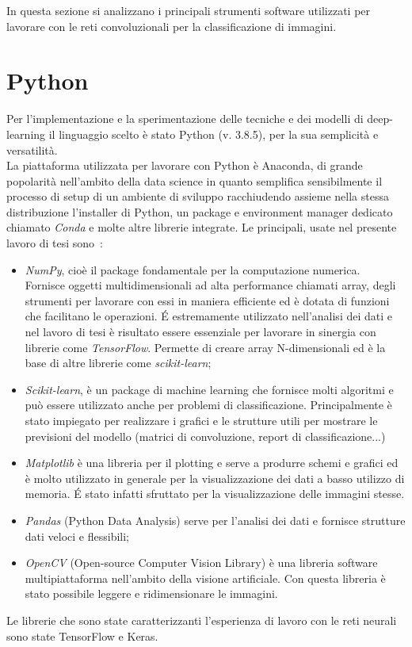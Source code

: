 In questa sezione si analizzano i principali strumenti software utilizzati per lavorare
con le reti convoluzionali per la classificazione di immagini.
\section{Python}
Per l'implementazione e la sperimentazione delle tecniche e dei modelli di deep-learning il linguaggio 
scelto è stato Python (v. 3.8.5), per la sua semplicità e versatilità.\\
La piattaforma utilizzata per lavorare con Python è Anaconda, di grande popolarità nell'ambito della data 
science in quanto semplifica sensibilmente il processo di setup di un ambiente di sviluppo
racchiudendo assieme nella stessa distribuzione l'installer di Python, un package e environment manager dedicato chiamato \emph{Conda} e molte altre librerie integrate.
Le principali, usate nel presente lavoro di tesi sono~\cite{lib}:
\begin{itemize}
    \item \emph{NumPy}, cioè il package fondamentale per la computazione numerica. \\
    Fornisce oggetti multidimensionali ad alta performance chiamati array, degli strumenti per
     lavorare con essi in maniera efficiente ed è dotata di funzioni che facilitano le operazioni. 
     É estremamente utilizzato nell'analisi dei
     dati e nel lavoro di tesi è risultato essere essenziale per lavorare in sinergia con librerie
      come \emph{TensorFlow}.
    Permette di creare array N-dimensionali ed è la base di altre librerie come \emph{scikit-learn};
    \item \emph{Scikit-learn}, è un package di machine learning che fornisce molti algoritmi e può essere utilizzato
    anche per problemi di classificazione. Principalmente è stato impiegato per realizzare i grafici e le strutture utili 
    per mostrare le previsioni del modello (matrici di convoluzione, report di classificazione...)
    \item \emph{Matplotlib} è una libreria per il plotting e serve a produrre schemi e grafici ed
     è molto utilizzato 
    in generale per la visualizzazione dei dati a basso utilizzo di memoria. É stato infatti sfruttato per la visualizzazione delle immagini stesse. 
    \item \emph{Pandas} (Python Data Analysis) serve per l'analisi dei dati e fornisce strutture 
    dati veloci e flessibili;
    \item \emph{OpenCV} (Open-source Computer Vision Library) è una libreria software multipiattaforma nell'ambito della visione artificiale. 
    Con questa libreria è stato possibile leggere e ridimensionare le immagini. 
    
\end{itemize}
Le librerie che sono state caratterizzanti l'esperienza di lavoro con le reti neurali sono state 
TensorFlow e Keras.

